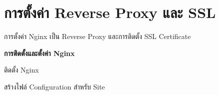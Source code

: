 \section{การตั้งค่า Reverse Proxy และ SSL}
\hspace*{1.5em}
การตั้งค่า Nginx เป็น Reverse Proxy และการติดตั้ง SSL Certificate

\vspace{0.5em}
\textbf{การติดตั้งและตั้งค่า Nginx}
\vspace{0.5em}

\begin{mycustomenum2}
    \item ติดตั้ง Nginx

\begin{figure}[htbp]
\centering
{}
\caption{}
\label{figE:NginxInstall}
\end{figure}

    \item สร้างไฟล์ Configuration สำหรับ Site


\end{mycustomenum2}
